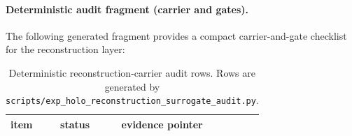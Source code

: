 \paragraph{Deterministic audit fragment (carrier and gates).}
\AuditTag The following generated fragment provides a compact carrier-and-gate checklist for the reconstruction layer:
\begin{table}[H]
\centering
\scriptsize
\setlength{\tabcolsep}{6pt}
\renewcommand{\arraystretch}{1.15}
\begin{tabular}{p{} p{} p{}}
\toprule
item & status & evidence pointer \\
\midrule
%
\end{tabular}
\caption{Deterministic reconstruction-carrier audit rows. Rows are generated by \texttt{scripts/exp\_holo\_reconstruction\_surrogate\_audit.py}.}
\label{tab:holo_reconstruction_surrogate_audit}
\end{table}
%
